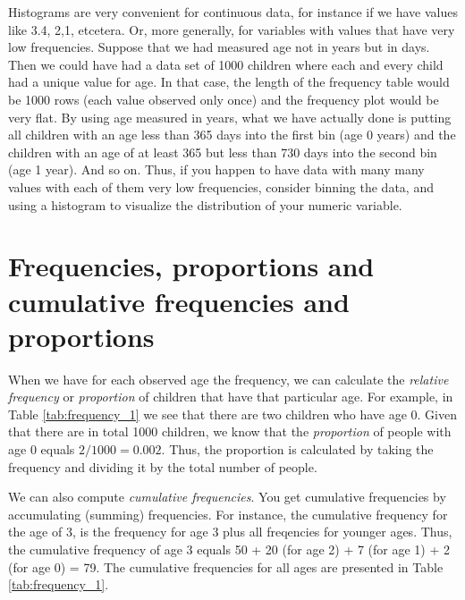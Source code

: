 Histograms are very convenient for continuous data, for instance if we have values like 3.4, 2,1, etcetera. Or, more generally, for variables with values that have very low frequencies. Suppose that we had measured age not in years but in days. Then we could have had a data set of 1000 children where each and every child had a unique value for age. In that case, the length of the frequency table would be 1000 rows (each value observed only once) and the frequency plot would be very flat. By using age measured in years, what we have actually done is putting all children with an age less than 365 days into the first bin (age 0 years) and the children with an age of at least 365 but less than 730 days into the second bin (age 1 year). And so on. Thus, if you happen to have data with many many values with each of them very low frequencies, consider binning the data, and using a histogram to visualize the distribution of your numeric variable.



\begin{knitrout}
\color{fgcolor}\begin{kframe}


{\ttfamily\noindent\bfseries{}}\end{kframe}
\end{knitrout}



\section{Frequencies, proportions and cumulative frequencies and proportions}


When we have for each observed age the frequency, we can calculate the \textit{relative frequency} or \textit{proportion} of children that have that particular age. For example, in Table \ref{tab:frequency_1} we see that there are two children who have age 0. Given that there are in total 1000 children, we know that the \textit{proportion} of people with age 0 equals $2/1000=0.002$. Thus, the proportion is calculated by taking the frequency and dividing it by the total number of people.


We can also compute \textit{cumulative frequencies}. You get cumulative frequencies by accumulating (summing) frequencies. For instance, the cumulative frequency for the age of 3, is the frequency for age 3 plus all freqencies for younger ages. Thus, the cumulative frequency of age 3 equals 50 + 20 (for age 2) + 7 (for age 1) + 2 (for age 0) = 79. The cumulative frequencies for all ages are presented in Table \ref{tab:frequency_1}.

